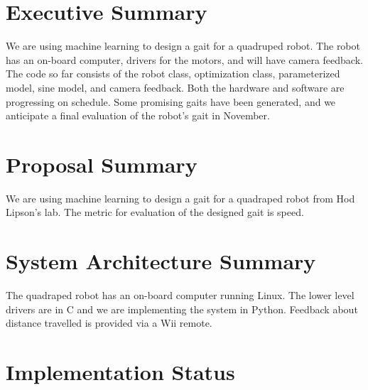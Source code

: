 \section{Executive Summary}
We are using machine learning to design a gait for a quadruped
robot. The robot has an on-board computer, drivers for the motors, and
will have camera feedback. The code so far consists of the robot
class, optimization class, parameterized model, sine model, and camera
feedback.  Both the hardware and software are progressing on schedule.
Some promising gaits have been generated, and we anticipate a final
evaluation of the robot’s gait in November.



\section{Proposal Summary}

We are using machine learning to design a gait for a quadraped robot
from Hod Lipson’s lab. The metric for evaluation of the designed gait
is speed.


\section{System Architecture Summary}

The quadraped robot has an on-board computer running Linux. The lower
level drivers are in C and we are implementing the system in
Python. Feedback about distance travelled is provided via a Wii remote. 


\section{Implementation Status}


